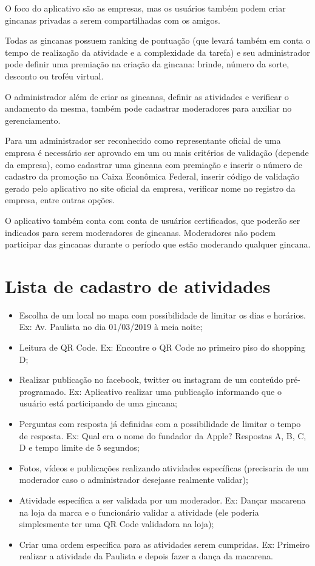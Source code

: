 \documentclass[
    12pt,               %
    openright,          %
    oneside,
    a4paper,            %
    draft,              %
    MODELO,             %
    TODO,               %
    english,            %
    brazil              %
    ]{ifsp-spo-inf-ctds}
\begin{document}
O foco do aplicativo são as empresas, mas os usuários também podem criar gincanas privadas a serem compartilhadas com os amigos.

Todas as gincanas possuem ranking de pontuação (que levará também em conta o tempo de realização da atividade e a complexidade da tarefa) e seu administrador pode definir uma premiação na criação da gincana: brinde, número da sorte, desconto ou troféu virtual.

O administrador além de criar as gincanas, definir as atividades e verificar o andamento da mesma, também pode cadastrar moderadores para auxiliar no gerenciamento. 

Para um administrador ser reconhecido como representante oficial de uma empresa é necessário ser aprovado em um ou mais critérios de validação (depende da empresa), como cadastrar uma gincana com premiação e inserir o número de cadastro da promoção na Caixa Econômica Federal, inserir código de validação gerado pelo aplicativo no site oficial da empresa, verificar nome no registro da empresa, entre outras opções.

O aplicativo também conta com conta de usuários certificados, que poderão ser indicados para serem moderadores de gincanas. Moderadores não podem participar das gincanas durante o período que estão moderando qualquer gincana.
 
\section{Lista de cadastro de atividades}
\begin{itemize}
\item Escolha de um local no mapa com possibilidade de limitar os dias e horários. Ex: Av. Paulista no dia 01/03/2019 à meia noite;
\item Leitura de QR Code. Ex: Encontre o QR Code no primeiro piso do shopping D;
\item Realizar publicação no facebook, twitter ou instagram de um conteúdo pré-programado. Ex: Aplicativo realizar uma publicação informando que o usuário está participando de uma gincana;
\item Perguntas com resposta já definidas com a possibilidade de limitar o tempo de resposta. Ex: Qual era o nome do fundador da Apple? Respostas A, B, C, D e tempo limite de 5 segundos;
\item Fotos, vídeos e publicações realizando atividades específicas (precisaria de um moderador caso o administrador desejasse realmente validar);
\item Atividade específica a ser validada por um moderador. Ex: Dançar macarena na loja da marca e o funcionário validar a atividade (ele poderia simplesmente ter uma QR Code validadora na loja);
\item Criar uma ordem específica para as atividades serem cumpridas. Ex: Primeiro realizar a atividade da Paulista e depois fazer a dança da macarena.
\end{itemize}
\end{document}

